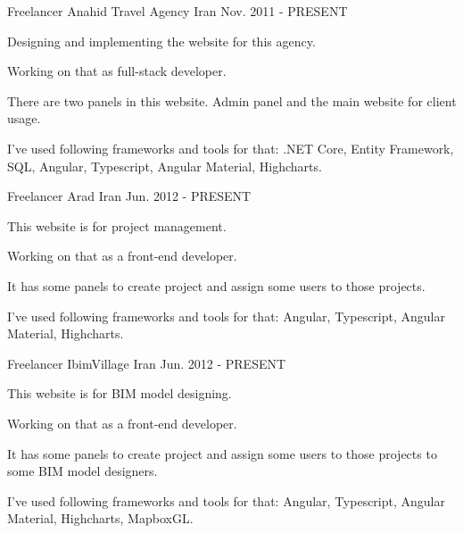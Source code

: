 

\begin{cventries}

  \cventry
    {Freelancer} %
    {Anahid Travel Agency} %
    {Iran} %
    {Nov. 2011 - PRESENT} %
    {
      \begin{cvitems} %
        \item {Designing and implementing the website for this agency.}
        \item {Working on that as full-stack developer.}
        \item {There are two panels in this website. Admin panel and the main website for client usage.}
        \item {I've used following frameworks and tools for that: .NET Core, Entity Framework, SQL, Angular, Typescript, Angular Material, Highcharts.}
      \end{cvitems}
    }

  \cventry
    {Freelancer} %
    {Arad} %
    {Iran} %
    {Jun. 2012 - PRESENT} %
    {
      \begin{cvitems} %
        \item {This website is for project management.}
        \item {Working on that as a front-end developer.}
        \item {It has some panels to create project and assign some users to those projects.}
        \item {I've used following frameworks and tools for that: Angular, Typescript, Angular Material, Highcharts.}
      \end{cvitems}
    }

\cventry
{Freelancer} %
{IbimVillage} %
{Iran} %
{Jun. 2012 - PRESENT} %
{
	\begin{cvitems} %
		\item {This website is for BIM model designing.}
		\item {Working on that as a front-end developer.}
		\item {It has some panels to create project and assign some users to those projects to some BIM model designers.}
		\item {I've used following frameworks and tools for that: Angular, Typescript, Angular Material, Highcharts, MapboxGL.}
	\end{cvitems}
}

\end{cventries}
